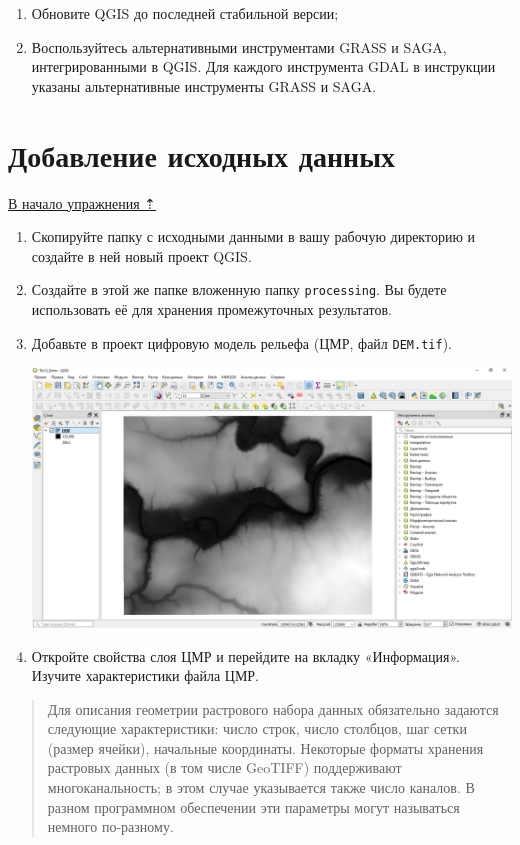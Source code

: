 \documentclass[
  12pt,
]{book}
\begin{document}
\begin{enumerate}
\def\labelenumi{\arabic{enumi})}
\item
  Обновите QGIS до последней стабильной версии;
\item
  Воспользуйтесь альтернативными инструментами GRASS и SAGA, интегрированными в QGIS. Для каждого инструмента GDAL в инструкции указаны альтернативные инструменты GRASS и SAGA.
\end{enumerate}

\hypertarget{weighted-overlay-init}{%
\section{Добавление исходных данных}\label{weighted-overlay-init}}

\protect\hyperlink{weighted-overlay}{В начало упражнения ⇡}

\begin{enumerate}
\def\labelenumi{\arabic{enumi}.}
\item
  Скопируйте папку с исходными данными в вашу рабочую директорию и создайте в ней новый проект QGIS.
\item
  Создайте в этой же папке вложенную папку \texttt{processing}. Вы будете использовать её для хранения промежуточных результатов.
\item
  Добавьте в проект цифровую модель рельефа (ЦМР, файл \texttt{DEM.tif}).

  \includegraphics{images/Ex12/dem.png}
\item
  Откройте свойства слоя ЦМР и перейдите на вкладку «Информация». Изучите характеристики файла ЦМР.
\end{enumerate}

\begin{quote}
Для описания геометрии растрового набора данных обязательно задаются следующие характеристики: число строк, число столбцов, шаг сетки (размер ячейки), начальные координаты. Некоторые форматы хранения растровых данных (в том числе GeoTIFF) поддерживают многоканальность; в этом случае указывается также число каналов. В разном программном обеспечении эти параметры могут называться немного по-разному.
\end{quote}
\end{document}
